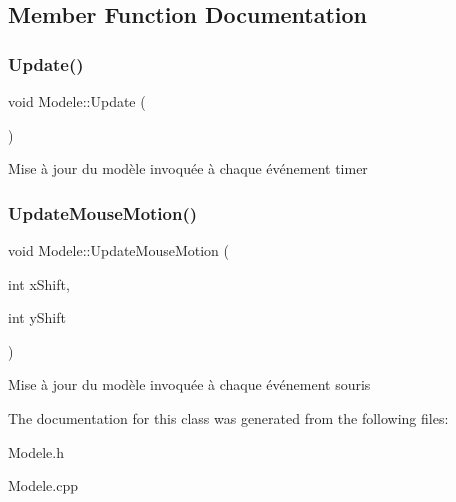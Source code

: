 \subsection{Member Function Documentation}
\mbox{\label{classModele_a4e09a90f4eac78fa17d362fe4ff23b2f}} 
\subsubsection{\texorpdfstring{Update()}{Update()}}
{\footnotesize\ttfamily void Modele\+::\+Update (\begin{DoxyParamCaption}{ }\end{DoxyParamCaption})}

Mise à jour du modèle invoquée à chaque événement timer \mbox{\label{classModele_aef3228db18a65e19289f9c00e8684fc5}} 
\subsubsection{\texorpdfstring{UpdateMouseMotion()}{UpdateMouseMotion()}}
{\footnotesize\ttfamily void Modele\+::\+Update\+Mouse\+Motion (\begin{DoxyParamCaption}\item[{int}]{x\+Shift,  }\item[{int}]{y\+Shift }\end{DoxyParamCaption})}

Mise à jour du modèle invoquée à chaque événement souris 

The documentation for this class was generated from the following files\+:\begin{DoxyCompactItemize}
\item 
Modele.\+h\item 
Modele.\+cpp\end{DoxyCompactItemize}
